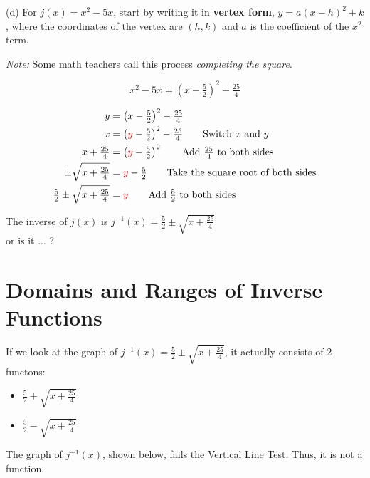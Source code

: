 \begin{solution}
\vspace{0.25in}

(d) For $j(x) = x^2 - 5x$, start by writing it in {\color{-red!75}\textbf{vertex form}}, $y = a(x-h)^2 + k$, where the coordinates of the vertex are $(h, k)$ and $a$ is the coefficient of the $x^2$ term. \newline 

\emph{Note:} Some math teachers call this process \textit{completing the square}.

\[
x^2 - 5x = \left(x-\tfrac{5}{2}\right)^2 - \tfrac{25}{4}
\]

\begin{align*}
    y &= \left(x-\tfrac{5}{2}\right)^2-\tfrac{25}{4} \\
    x &= \left({\color{red}{y}}-\tfrac{5}{2}\right)^2-\tfrac{25}{4} \qquad \text{Switch $x$ and $y$} \\
    x + \tfrac{25}{4} &= \left({\color{red}{y}}-\tfrac{5}{2}\right)^2 \qquad \text{Add $\tfrac{25}{4}$ to both sides} \\
    \pm \sqrt{x + \tfrac{25}{4}} &= {\color{red}{y}} - \tfrac{5}{2} \qquad \text{Take the square root of both sides} \\
    \tfrac{5}{2} \pm \sqrt{x + \tfrac{25}{4}} &= {\color{red}{y}} \qquad \text{Add $\tfrac{5}{2}$ to both sides}
\end{align*}

The inverse of $j(x)$ is $\boxed{j^{-1}(x) = \tfrac{5}{2} \pm \sqrt{x + \tfrac{25}{4}}}$ \newline\\

or is it ... ? 
\end{solution}

\section{Domains and Ranges of Inverse Functions}

If we look at the graph of $j^{-1}(x) = \tfrac{5}{2} \pm \sqrt{x + \tfrac{25}{4}}$, it actually consists of 2 functons:

\begin{itemize}
    \item $\tfrac{5}{2} + \sqrt{x+\tfrac{25}{4}}$
    \item $\tfrac{5}{2} - \sqrt{x+\tfrac{25}{4}}$
\end{itemize}

The graph of $j^{-1}(x)$, shown below, fails the Vertical Line Test. Thus, it is not a function. \newline 

